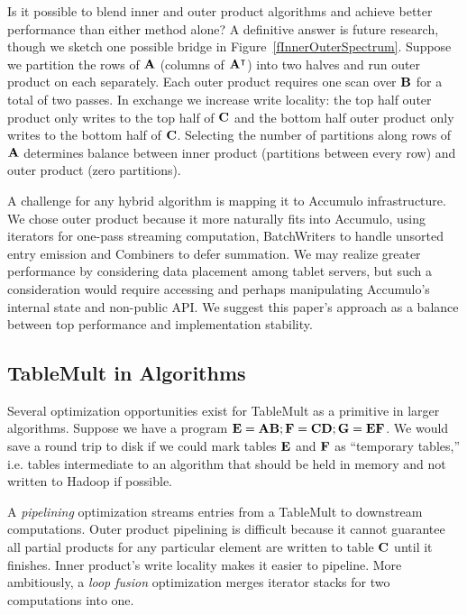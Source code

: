 Is it possible to blend inner and outer product algorithms and achieve better performance than either method alone?
A definitive answer is future research, though we sketch one possible bridge in Figure~\ref{fInnerOuterSpectrum}.
Suppose we partition the rows of $\mathbf{A}$ (columns of $\mathbf{A^{\intercal}}$) into two halves 
and run outer product on each separately.
Each outer product requires one scan over $\mathbf{B}$ for a total of two passes.
In exchange we increase write locality:
the top half outer product only writes to the top half of $\mathbf{C}$ and 
the bottom half outer product only writes to the bottom half of $\mathbf{C}$.
Selecting the number of partitions along rows of $\mathbf{A}$ determines
balance between inner product (partitions between every row) and outer product (zero partitions).

A challenge for any hybrid algorithm is mapping it to Accumulo infrastructure.
We chose outer product because it more naturally fits into Accumulo, 
using iterators for one-pass streaming computation, 
BatchWriters to handle unsorted entry emission and Combiners to defer summation.
We may realize greater performance by considering data placement among tablet servers, 
but such a consideration would require accessing and perhaps manipulating
Accumulo's internal state and non-public API.
We suggest this paper's approach as a balance between top performance and implementation stability.


\subsection{TableMult in Algorithms}
Several optimization opportunities exist for TableMult as a primitive in larger algorithms.
Suppose we have a program $\mathbf{E} = \mathbf{AB}; \mathbf{F} = \mathbf{CD}; \mathbf{G} = \mathbf{EF}$.
We would save a round trip to disk if we could mark tables $\mathbf{E}$ and $\mathbf{F}$ as 
``temporary tables,'' i.e. tables intermediate to an algorithm that should be held in memory 
and not written to Hadoop if possible.

A \emph{pipelining} optimization streams entries from a TableMult to downstream computations. 
Outer product pipelining is difficult
because it cannot guarantee all partial products for any particular element 
are written to table $\mathbf{C}$ until it finishes.
Inner product's write locality makes it easier to pipeline.
More ambitiously, a \emph{loop fusion} optimization merges iterator stacks 
for two computations into one. 

